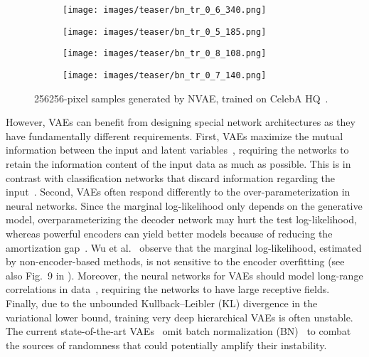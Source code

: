 \documentclass{article}
\begin{document}
\begin{figure}[!h]
\centering
\hspace{-0.2cm}
\begin{subfigure}[b]{.24\textwidth}
\centering
\texttt{[image: images/teaser/bn\_tr\_0\_6\_340.png]}
\end{subfigure}
\begin{subfigure}[b]{.24\textwidth}
\centering
\texttt{[image: images/teaser/bn\_tr\_0\_5\_185.png]}
\end{subfigure}
\begin{subfigure}[b]{.24\textwidth}
\centering
\texttt{[image: images/teaser/bn\_tr\_0\_8\_108.png]}
\end{subfigure}
\begin{subfigure}[b]{.24\textwidth}
\centering
\texttt{[image: images/teaser/bn\_tr\_0\_7\_140.png]}
\end{subfigure}

\caption{256256-pixel samples generated by NVAE, trained on CelebA HQ~\cite{karras2018progressive}.}
\label{fig:teaser}
\vspace{-0.3cm}
\end{figure} 
However, VAEs can benefit from designing special network architectures as they have fundamentally different requirements. First, VAEs maximize the mutual information between the input and latent variables~\cite{barber2004IM, alemi2016info}, requiring the networks to retain the information content of the input data as much as possible. This is in contrast with classification networks that discard information regarding the input~\cite{shwartz2017IB}. Second, VAEs often respond differently to the over-parameterization in neural networks. Since the marginal log-likelihood only depends on the generative model, overparameterizing the decoder network may hurt the test log-likelihood, whereas powerful encoders can yield better models because of reducing the amortization gap~\cite{cremer18amortization}. Wu et al.~\cite{wu2016quantitative} observe that the marginal log-likelihood, estimated by non-encoder-based methods, is not 
sensitive to the encoder overfitting (see also Fig.~9 in \cite{rolfe2016discrete}).
Moreover, the neural networks for VAEs should model long-range correlations in data~\cite{dieleman2018longrange, chen2018pixelsnail, sadeghi2019pixelvae++}, requiring the networks to have large receptive fields. Finally, due to the unbounded Kullback–Leibler (KL) divergence in the variational lower bound, training very deep hierarchical VAEs is often unstable. The current state-of-the-art VAEs~\cite{kingma2016improved, maaloe2019biva} omit batch normalization (BN)~\cite{ioffe2015batch} to combat the sources of randomness that could potentially amplify their instability. 
\end{document}
